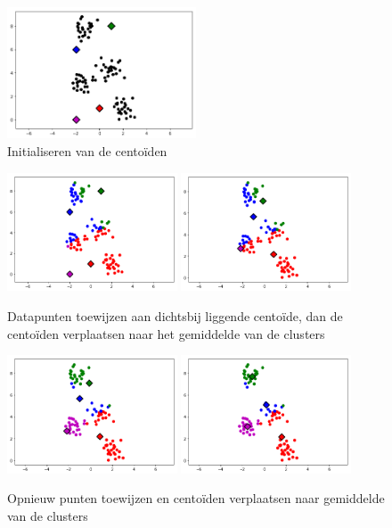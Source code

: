 \documentclass{article}
\begin{document}
\begin{figure}[H]
    \centering
    \includegraphics[width=0.5\textwidth]{k-means-2.png}
    \caption{Initialiseren van de centoïden}
\end{figure}

\begin{figure}[H]
    \centering
    \includegraphics[width=0.45\textwidth]{k-means-3.png}
    \includegraphics[width=0.45\textwidth]{k-means-4.png}
    \caption{Datapunten toewijzen aan dichtsbij liggende centoïde, dan de centoïden verplaatsen naar het gemiddelde van de clusters}
\end{figure}


\begin{figure}[H]
    \centering
    \includegraphics[width=0.45\textwidth]{k-means-5.png}
    \includegraphics[width=0.45\textwidth]{k-means-6.png}
    \caption{Opnieuw punten toewijzen en centoïden verplaatsen naar gemiddelde van de clusters}
\end{figure}
\end{document}
